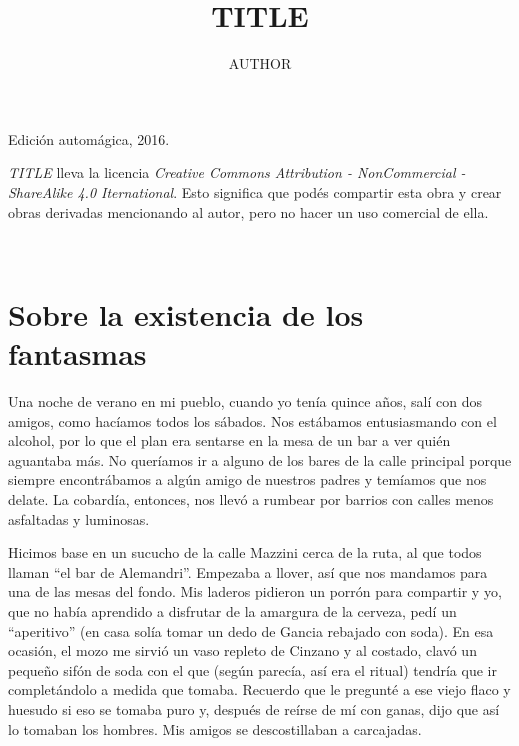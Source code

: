 \documentclass[11pt,twoside,openright]{book}
\title{TITLE}
\author{AUTHOR}
\date{}
\begin{document}

\pagestyle{plain}


%
%

\maketitle

\cleardoublepage

\thispagestyle{empty}
\noindent
Edición automágica, 2016.\\

\vspace{0.5cm}

\noindent
\emph{TITLE} lleva la licencia
\emph{Creative Commons Attribution - NonCommercial - ShareAlike 4.0 Iternational}.
Esto significa que podés compartir esta obra y crear obras derivadas
mencionando al autor, pero no ha\-cer un uso comercial de ella.

\vfill

\noindent
\\

\cleardoublepage








\chapter*{Sobre la existencia de los fantasmas} 





Una noche de verano en mi pueblo, cuando yo tenía quince años, salí con dos amigos, como hacíamos todos los sábados. Nos estábamos entusiasmando con el alcohol, por lo que el plan era sentarse en la mesa de un bar a ver quién aguantaba más. No queríamos ir a alguno de los bares de la calle principal porque siempre encontrábamos a algún amigo de nuestros padres y temíamos que nos delate. La cobardía, entonces, nos llevó a rumbear por barrios con calles menos asfaltadas y luminosas.

Hicimos base en un sucucho de la calle Mazzini cerca de la ruta, al que todos llaman “el bar de Alemandri”. Empezaba a llover, así que nos mandamos para una de las mesas del fondo. Mis laderos pidieron un porrón para compartir y yo, que no había aprendido a disfrutar de la amargura de la cerveza, pedí un “aperitivo” (en casa solía tomar un dedo de Gancia rebajado con soda). En esa ocasión, el mozo me sirvió un vaso repleto de Cinzano y al costado, clavó un pequeño sifón de soda con el que (según parecía, así era el ritual) tendría que ir completándolo a medida que tomaba. Recuerdo que le pregunté a ese viejo flaco y huesudo si eso se tomaba puro y, después de reírse de mí con ganas, dijo que así lo tomaban los hombres. Mis amigos se descostillaban a carcajadas.
\end{document}
